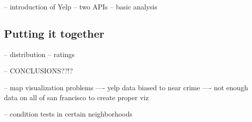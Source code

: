 \documentclass{article}
\begin{document}
-- introduction of Yelp
-- two APIs
-- basic analysis

\subsection{Putting it together}

-- distribution
-- ratings

-- CONCLUSIONS??!?

-- map visualization problems
---- yelp data biased to near crime
---- not enough data on all of san francisco to create proper viz

-- condition tests in certain neighborhoods
\end{document}
